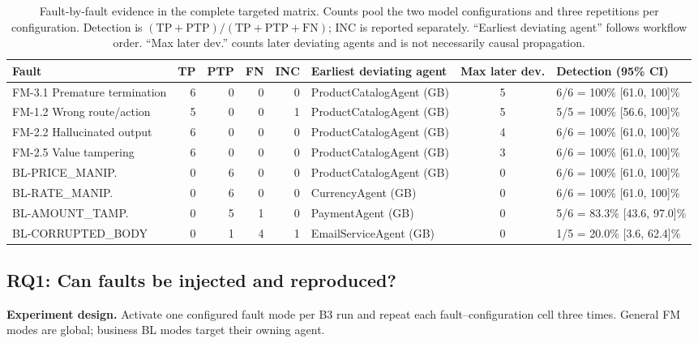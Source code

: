 \documentclass[sigconf,review,anonymous,balance=false]{acmart}
\begin{document}
\begin{table}[t]
\centering
\caption{Fault-by-fault evidence in the complete targeted matrix. Counts pool
the two model configurations and three repetitions per configuration. Detection
is $(\mathrm{TP}+\mathrm{PTP})/(\mathrm{TP}+\mathrm{PTP}+\mathrm{FN})$; INC is
reported separately. ``Earliest deviating agent'' follows workflow order.
``Max later dev.'' counts later deviating agents and is not necessarily causal
propagation.}
\label{tab:b3-fault-summary-simple}
\footnotesize
\begin{tabularx}{\textwidth}{lrrrrYcY}
\toprule
\textbf{Fault} & \textbf{TP} & \textbf{PTP} & \textbf{FN} & \textbf{INC} & \textbf{Earliest deviating agent} & \textbf{Max later dev.} & \textbf{Detection (95\% CI)} \\
\midrule
FM-3.1 Premature termination & 6 & 0 & 0 & 0 & ProductCatalogAgent (GB) & 5 & 6/6 = 100\% [61.0, 100]\% \\
FM-1.2 Wrong route/action    & 5 & 0 & 0 & 1 & ProductCatalogAgent (GB) & 5 & 5/5 = 100\% [56.6, 100]\% \\
FM-2.2 Hallucinated output   & 6 & 0 & 0 & 0 & ProductCatalogAgent (GB) & 4 & 6/6 = 100\% [61.0, 100]\% \\
FM-2.5 Value tampering       & 6 & 0 & 0 & 0 & ProductCatalogAgent (GB) & 3 & 6/6 = 100\% [61.0, 100]\% \\
BL-PRICE\_MANIP.             & 0 & 6 & 0 & 0 & ProductCatalogAgent (GB) & 0 & 6/6 = 100\% [61.0, 100]\% \\
BL-RATE\_MANIP.              & 0 & 6 & 0 & 0 & CurrencyAgent (GB)       & 0 & 6/6 = 100\% [61.0, 100]\% \\
BL-AMOUNT\_TAMP.             & 0 & 5 & 1 & 0 & PaymentAgent (GB)        & 0 & 5/6 = 83.3\% [43.6, 97.0]\% \\
BL-CORRUPTED\_BODY           & 0 & 1 & 4 & 1 & EmailServiceAgent (GB)   & 0 & 1/5 = 20.0\% [3.6, 62.4]\% \\
\bottomrule
\end{tabularx}
\end{table}

\subsection{RQ1: Can faults be injected and reproduced?}

\textbf{Experiment design.} Activate one configured fault mode per B3 run and
repeat each fault--configuration cell three times. General FM modes are global;
business BL modes target their owning agent.
\end{document}
